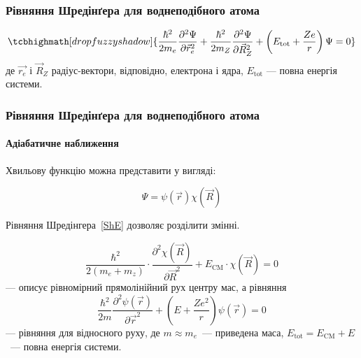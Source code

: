 \documentclass[]{beamer}
\begin{document}


\begin{frame}
	\frametitle{Рівняння Шредінґера для воднеподібного атома}
	\begin{center}
	\end{center}
	\begin{equation}\label{ShE}
		\tcbhighmath[drop fuzzy shadow]{\frac{\hbar^2}{2m_e}\frac{\partial^2 \Psi}{\partial \vec r_e^2} + \frac{\hbar ^2}{2m_Z}\frac{\partial^2 \Psi}{\partial \vec R_Z^2} + \left(E_\mathrm{tot} + \frac{Ze}{r} \right)\Psi  = 0}
	\end{equation}
	де  $\vec{r_e}$ і $\vec{R}_Z$ радіус-вектори, відповідно, електрона і ядра, $E_\mathrm{tot}$ --- повна енергія системи.
\end{frame}
\begin{frame}
	\frametitle{Рівняння Шредінґера для воднеподібного атома}
	\framesubtitle{Адіабатичне наближення}

	Хвильову функцію можна представити у вигляді:

	\begin{equation}\label{BO}
		\Psi = \psi(\vec r)\chi(\vec R)
	\end{equation}

	Рівняння Шредінгера~\eqref{ShE} дозволяє розділити змінні.

	\begin{equation}\label{key}
		\frac{\hbar ^2}{2(m_e + m_z)} \cdot \frac{\partial ^2\chi(\vec R)}{\partial \vec R^2} + E_\mathrm{CM}\cdot\chi(\vec R) = 0
	\end{equation}
	--- описує рівномірний прямолінійний рух центру мас, а рівняння
	\begin{equation}\label{ShE_relative}
		\frac{\hbar ^2}{2m}\frac{\partial ^2\psi(\vec r)}{\partial \vec r^2} + \left( E + \frac{Ze^2}{r} \right)\psi(\vec r) = 0
	\end{equation}
	--- рівняння для відносного руху, де $m\approx m_e$~--- приведена маса, $E_\mathrm{tot} = E_\mathrm{CM} + E$~--- повна енергія системи.

\end{frame}
\end{document}

